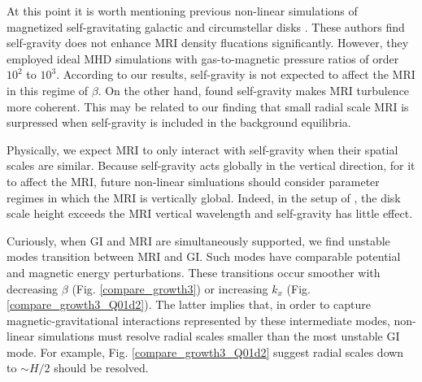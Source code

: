 At this point it is worth mentioning previous non-linear simulations
of magnetized self-gravitating galactic and circumstellar disks
\citep{kim03,fromang04a,fromang04}. These authors find self-gravity
does not enhance MRI density flucations significantly. However, they
employed ideal MHD simulations with gas-to-magnetic pressure ratios of
order $10^2$ to $10^3$. According  
to our results, self-gravity is not expected to affect the MRI in this
regime of $\beta$. On the other hand, \cite{fromang04} found
self-gravity makes MRI turbulence more coherent. This may be related
to our finding that small radial scale MRI is surpressed when
self-gravity is included in the background equilibria. 

Physically, we expect MRI to only interact with self-gravity when
their spatial scales are similar. Because self-gravity acts globally in the
vertical direction, for it to affect the MRI, future non-linear
simluations should consider parameter regimes in which the MRI is
vertically global. Indeed, in the setup of \cite{kim03}, the disk
scale height exceeds the MRI vertical wavelength and self-gravity has
little effect.   


Curiously, when GI and MRI are simultaneously supported, we find
unstable modes transition between MRI and GI. Such modes
have comparable potential and magnetic energy perturbations. These
transitions occur smoother with decreasing $\beta$
(Fig. \ref{compare_growth3}) or increasing $k_x$
(Fig. \ref{compare_growth3_Q01d2}). The latter implies that, in order
to capture magnetic-gravitational interactions represented by these
intermediate modes, non-linear simulations must resolve radial scales
smaller than the most unstable GI mode. For example, 
Fig. \ref{compare_growth3_Q01d2} suggest radial scales down to $\sim H/2$
should be resolved. 


